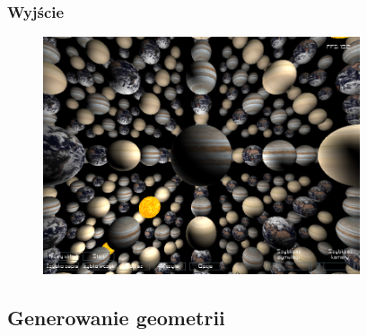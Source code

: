 \documentclass{beamer}
\begin{document}
\frame
{
	\frametitle{Wyjście}
	\begin{figure}
	\centering
	\includegraphics[height=7cm]{img/r_curr.png}
	\label{fig:deffered_rednering}
	\end{figure}

}

\subsection{Generowanie geometrii}\label{sub:generowanie geometrii}
\end{document}
